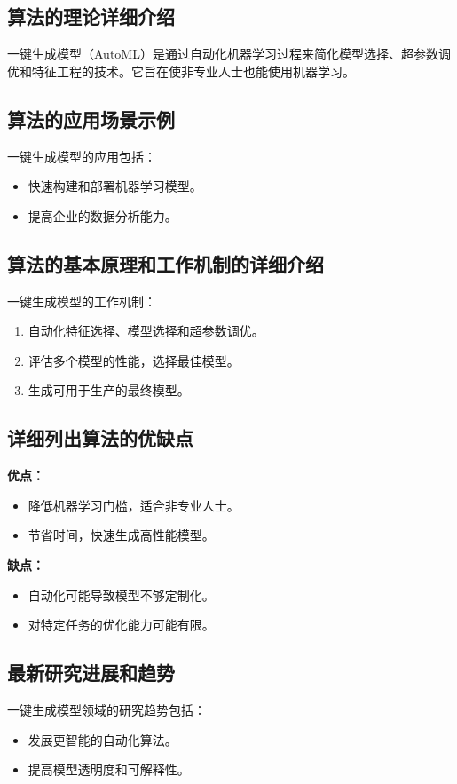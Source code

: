 \subsection*{算法的理论详细介绍}
一键生成模型（AutoML）是通过自动化机器学习过程来简化模型选择、超参数调优和特征工程的技术。它旨在使非专业人士也能使用机器学习。

\subsection*{算法的应用场景示例}
一键生成模型的应用包括：
\begin{itemize}
    \item 快速构建和部署机器学习模型。
    \item 提高企业的数据分析能力。
\end{itemize}

\subsection*{算法的基本原理和工作机制的详细介绍}
一键生成模型的工作机制：
\begin{enumerate}
    \item 自动化特征选择、模型选择和超参数调优。
    \item 评估多个模型的性能，选择最佳模型。
    \item 生成可用于生产的最终模型。
\end{enumerate}

\subsection*{详细列出算法的优缺点}
\textbf{优点：}
\begin{itemize}
    \item 降低机器学习门槛，适合非专业人士。
    \item 节省时间，快速生成高性能模型。
\end{itemize}

\textbf{缺点：}
\begin{itemize}
    \item 自动化可能导致模型不够定制化。
    \item 对特定任务的优化能力可能有限。
\end{itemize}

\subsection*{最新研究进展和趋势}
一键生成模型领域的研究趋势包括：
\begin{itemize}
    \item 发展更智能的自动化算法。
    \item 提高模型透明度和可解释性。
\end{itemize}
